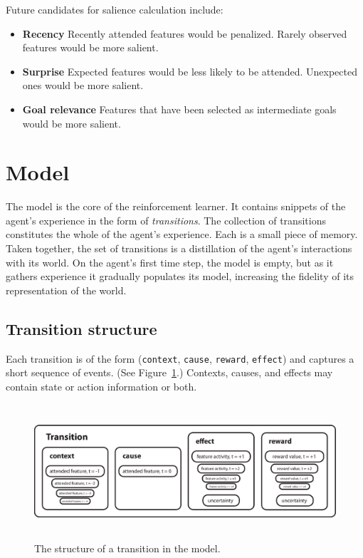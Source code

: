 Future candidates for salience calculation include:

\begin{itemize}
\item {\bf Recency}  Recently attended features would be penalized. Rarely observed features would be more salient.
\item {\bf Surprise} Expected features would be less likely to be attended. Unexpected ones would be more salient.
\item {\bf Goal relevance} Features that have been selected as intermediate goals would be more salient.
\end{itemize}


\section{Model}
The model is the core of the reinforcement learner. It contains snippets of the agent's experience in the form of {\em transitions}. The collection of transitions constitutes the whole of the agent's experience. Each is a small piece of memory. Taken together, the set of transitions is a distillation of the agent's interactions with its world. On the agent's first time step, the model is empty, but as it gathers experience it gradually populates its model, increasing the fidelity of its representation of the world. 

\subsection{Transition structure}

Each transition is of the form (\texttt{context}, \texttt{cause}, \texttt{reward}, \texttt{effect}) and captures a short sequence of events. (See Figure~\ref{transition_structure}.) Contexts, causes, and effects may contain state or action information or both.

\begin{figure}
\centering
\includegraphics[height=5cm]{figs/transition.eps}
\caption{The structure of a transition in the model.}
\label{transition_structure}
\end{figure}

